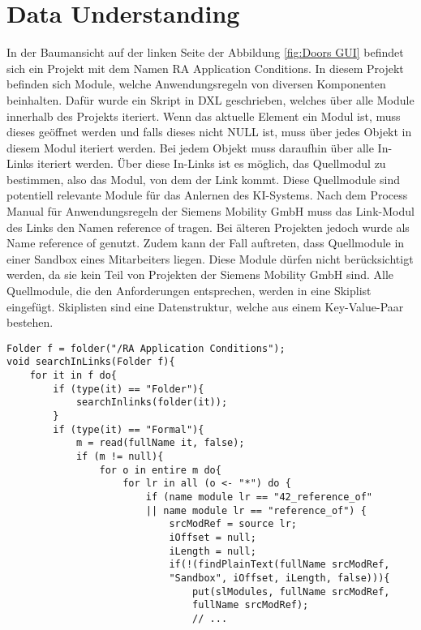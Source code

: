 \section{Data Understanding}
\label{chap:DataUnderstanding}

In der Baumansicht auf der linken Seite der Abbildung \ref*{fig:Doors GUI} befindet sich ein Projekt mit dem Namen \glqq RA Application Conditions\grqq{}. In diesem Projekt befinden sich Module, welche
Anwendungsregeln von diversen Komponenten beinhalten. Dafür wurde ein Skript in \acs{DXL} geschrieben, welches über alle Module innerhalb des Projekts iteriert. Wenn das aktuelle Element ein Modul ist,
muss dieses geöffnet werden und falls dieses nicht NULL ist, muss über jedes Objekt in diesem Modul iteriert werden. Bei jedem Objekt muss daraufhin über alle In-Links iteriert werden. Über diese 
In-Links ist es möglich, das Quellmodul zu bestimmen, also das Modul, von dem der Link kommt. Diese Quellmodule sind potentiell relevante Module für das Anlernen des KI-Systems. Nach dem Process Manual für
Anwendungsregeln der Siemens Mobility GmbH \cite[S.32]{q2} muss das Link-Modul des Links den Namen  reference of\grqq{} tragen. Bei älteren Projekten jedoch wurde als Name 
\glqq reference of\grqq{} genutzt. Zudem kann der Fall auftreten, dass Quellmodule in einer Sandbox eines Mitarbeiters liegen. Diese Module dürfen nicht berücksichtigt werden, da sie kein Teil
von Projekten der Siemens Mobility GmbH sind. Alle Quellmodule, die den Anforderungen entsprechen, werden in eine Skiplist eingefügt. Skiplisten sind eine Datenstruktur, welche aus einem 
Key-Value-Paar bestehen. 

\begin{lstlisting}[caption={Iterieren über alle Module von RA Application Conditions},captionpos=b, label = lst:searchInLinks]
Folder f = folder("/RA Application Conditions");
void searchInLinks(Folder f){
    for it in f do{
        if (type(it) == "Folder"){
            searchInlinks(folder(it));
        }
        if (type(it) == "Formal"){
            m = read(fullName it, false);
            if (m != null){
                for o in entire m do{
                    for lr in all (o <- "*") do {
                        if (name module lr == "42_reference_of" 
                        || name module lr == "reference_of") {
                            srcModRef = source lr;
                            iOffset = null;
                            iLength = null;
                            if(!(findPlainText(fullName srcModRef, 
                            "Sandbox", iOffset, iLength, false))){
                                put(slModules, fullName srcModRef, 
                                fullName srcModRef);
                                // ...
\end{lstlisting}


